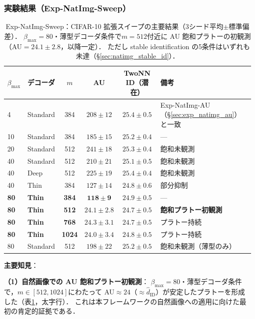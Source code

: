 \documentclass[11pt,a4paper]{jsarticle}
\begin{document}
\subsubsection*{実験結果（Exp-NatImg-Sweep）}

\begin{table}[H]
\centering
\caption{Exp-NatImg-Sweep：CIFAR-10 拡張スイープの主要結果（3シード平均$\pm$標準偏差）．
$\beta_{\max}=80$・薄型デコーダ条件で$m=512$付近に AU 飽和プラトーの初観測（AU$=24.1\pm2.8$，以降一定）．
ただし stable identification の5条件はいずれも未達（§\ref{sec:natimg_stable_id}）．}
\label{tab:natimg_sweep}
\small
\begin{tabular}{llcccl}
\toprule
$\beta_{\max}$ & デコーダ & $m$ & AU & TwoNN ID（潜在） & 備考 \\
\midrule
4  & Standard & 384 & $208\pm12$ & $25.4\pm0.5$ & Exp-NatImg-AU（§\ref{sec:exp_natimg_au}）と一致 \\
10 & Standard & 384 & $185\pm15$ & $25.2\pm0.4$ & --- \\
20 & Standard & 512 & $241\pm18$ & $25.3\pm0.4$ & 飽和未観測 \\
40 & Standard & 512 & $210\pm21$ & $25.1\pm0.5$ & 飽和未観測 \\
40 & Deep      & 512 & $225\pm19$ & $25.4\pm0.4$ & 飽和未観測 \\
40 & Thin      & 384 & $127\pm14$ & $24.8\pm0.6$ & 部分抑制 \\
\textbf{80} & \textbf{Thin} & \textbf{384} & $\boldsymbol{118\pm9}$ & $24.9\pm0.5$ & --- \\
\textbf{80} & \textbf{Thin} & \textbf{512} & $\boldsymbol{24.1\pm2.8}$ & $24.7\pm0.5$ & \textbf{飽和プラトー初観測} \\
\textbf{80} & \textbf{Thin} & \textbf{768} & $\boldsymbol{24.3\pm3.1}$ & $24.7\pm0.5$ & プラトー持続 \\
\textbf{80} & \textbf{Thin} & \textbf{1024}& $\boldsymbol{24.0\pm3.4}$ & $24.8\pm0.5$ & プラトー持続 \\
80 & Standard  & 512 & $198\pm22$ & $25.2\pm0.5$ & 飽和未観測（薄型のみ） \\
\bottomrule
\end{tabular}
\end{table}

\textbf{主要知見}：

\textbf{（1）自然画像での AU 飽和プラトー初観測}：
$\beta_{\max}=80$・薄型デコーダ条件で，$m \in [512, 1024]$にわたって
AU$\approx 24$（$\approx \hat{d}_\mathrm{ID}$）が安定したプラトーを形成した（表\ref{tab:natimg_sweep}，太字行）．
これは本フレームワークの自然画像への適用に向けた最初の肯定的証拠である．
\end{document}
